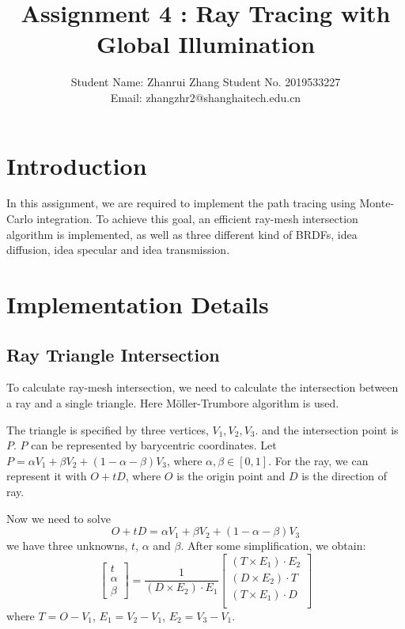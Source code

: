 \documentclass[acmtog]{acmart}
\title{Assignment 4 : Ray Tracing with Global Illumination}
\author{Student Name: Zhanrui Zhang \quad Student No. 2019533227\\ \quad Email: zhangzhr2@shanghaitech.edu.cn}
\begin{document}
\maketitle

\vspace*{2 ex}


\section{Introduction}

In this assignment, we are required to implement the path tracing using Monte-Carlo integration. To achieve this goal, an efficient ray-mesh intersection algorithm is implemented, as well as three different kind of BRDFs, idea diffusion, idea specular and idea transmission.

\section{Implementation Details}
\subsection{Ray Triangle Intersection}
To calculate ray-mesh intersection, we need to calculate the intersection between a ray and a single triangle. Here Möller-Trumbore algorithm is used.

The triangle is specified by three vertices, $V_1, V_2,V_3$. and the intersection point is $P$. $P$ can be represented by barycentric coordinates. Let $P = \alpha V_1 + \beta V_2 + (1-\alpha - \beta) V_3$, where $\alpha, \beta \in [0,1]$. For the ray, we can represent it with $O + tD$, where $O$ is the origin point and $D$ is the direction of ray.

Now we need to solve
\[O + tD = \alpha V_1 + \beta V_2 + (1-\alpha - \beta) V_3\]
we have three unknowns, $t$, $\alpha$ and $\beta$. After some simplification, we obtain:
\[
    \left[\begin{array}{c}
      t \\  \alpha \\ \beta
    \end{array}\right] = 
    \frac{1}{(D\times E_2)\cdot E_1}
    \left[\begin{array}{c}
        (T\times E_1) \cdot E_2\\
        (D\times E_2) \cdot T \\
        (T\times E_1) \cdot D\\
    \end{array}\right]
\]
where $T=O-V_1$, $E_1 = V_2-V_1$, $E_2 = V_3 - V_1$.
\end{document}
